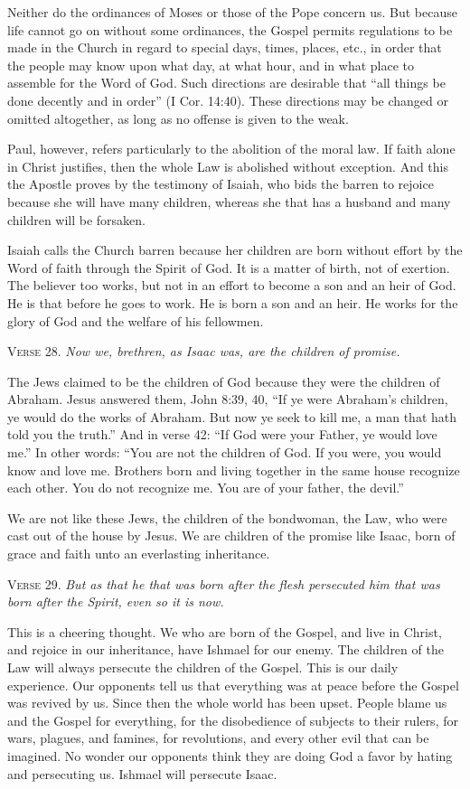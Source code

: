 Neither do the ordinances of Moses or those of the Pope concern us. But because life cannot go on without some ordinances, the Gospel permits regulations to be made in the Church in regard to special days, times, places, etc., in order that the people may know upon what day, at what hour, and in what place to assemble for the Word of God. Such directions are desirable that “all things be done decently and in order” (I Cor. 14:40). These directions may be changed or omitted altogether, as long as no offense is given to the weak.

Paul, however, refers particularly to the abolition of the moral law. If faith alone in Christ justifies, then the whole Law is abolished without exception. And this the Apostle proves by the testimony of Isaiah, who bids the barren to rejoice because she will have many children, whereas she that has a husband and many children will be forsaken.

Isaiah calls the Church barren because her children are born without effort by the Word of faith through the Spirit of God. It is a matter of birth, not of exertion. The believer too works, but not in an effort to become a son and an heir of God. He is that before he goes to work. He is born a son and an heir. He works for the glory of God and the welfare of his fellowmen.

\textsc{Verse} 28. \emph{Now we, brethren, as Isaac was, are the children of promise.}

The Jews claimed to be the children of God because they were the children of Abraham. Jesus answered them, John 8:39, 40, “If ye were Abraham’s children, ye would do the works of Abraham. But now ye seek to kill me, a man that hath told you the truth.” And in verse 42: “If God were your Father, ye would love me.” In other words: “You are not the children of God. If you were, you would know and love me. Brothers born and living together in the same house recognize each other. You do not recognize me. You are of your father, the devil.”

We are not like these Jews, the children of the bondwoman, the Law, who were cast out of the house by Jesus. We are children of the promise like Isaac, born of grace and faith unto an everlasting inheritance.

\textsc{Verse} 29. \emph{But as that he that was born after the flesh persecuted him that was born after the Spirit, even so it is now.}

This is a cheering thought. We who are born of the Gospel, and live in Christ, and rejoice in our inheritance, have Ishmael for our enemy. The children of the Law will always persecute the children of the Gospel. This is our daily experience. Our opponents tell us that everything was at peace before the Gospel was revived by us. Since then the whole world has been upset. People blame us and the Gospel for everything, for the disobedience of subjects to their rulers, for wars, plagues, and famines, for revolutions, and every other evil that can be imagined. No wonder our opponents think they are doing God a favor by hating and persecuting us. Ishmael will persecute Isaac.

